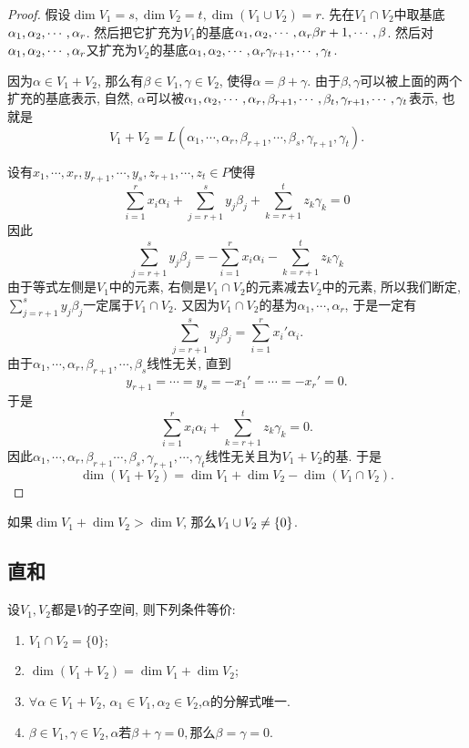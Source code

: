 \documentclass{ctexart}
\begin{document}
\begin{proof}
    假设$\dim V_1=s,\dim V_2=t, \dim (V_1\cup V_2)=r$. 先在$V_1 \cap V_2$中取基底${{\alpha}_1, {\alpha}_2,\cdots, {\alpha}_{r}}$. 然后把它扩充为$V_1$的基底${{\alpha}_1, {\alpha}_2,\cdots, {\alpha}_{r}} \beta{r+1},\cdots, \beta$. 然后对${{\alpha}_1, {\alpha}_2,\cdots, {\alpha}_{r}}$又扩充为$V_2$的基底${{\alpha}_1, {\alpha}_2,\cdots, {\alpha}_{r}} \gamma_{r+1},\cdots, \gamma_t$. 

    因为$\alpha\in V_1+V_2$, 那么有$\beta\in V_1,\gamma\in V_2$, 使得$\alpha=\beta+\gamma$. 由于$\beta,\gamma$可以被上面的两个扩充的基底表示, 自然, $\alpha$可以被${{\alpha}_1, {\alpha}_2,\cdots, {\alpha}_{r}}, \beta_{r+1},\cdots, \beta_{t},\gamma_{r+1},\cdots, \gamma_t$表示, 也就是
    \[
        V_1+V_2=L(\alpha_1,\cdots, \alpha_r, \beta_{r+1},\cdots, \beta_s,\gamma_{r+1},\gamma_t).
    \]

    设有$x_1, \cdots, x_r, y_{r+1}, \cdots, y_s, z_{r+1},\cdots,z_t\in P$使得
    \[
        \sum_{i=1}^{r}x_i\alpha_i + \sum_{j=r+1}^{s} y_j\beta_j + \sum_{k=r+1}^{t}z_k\gamma_k=0
    \]
    因此
    \[
       \sum_{j=r+1}^{s} y_j\beta_j =- \sum_{i=1}^{r}x_i\alpha_i-  \sum_{k=r+1}^{t}z_k\gamma_k
    \]
    由于等式左侧是$V_1$中的元素, 右侧是$V_1\cap V_2$的元素减去$V_2$中的元素, 所以我们断定,  $\sum_{j=r+1}^{s} y_j\beta_j$一定属于$V_1\cap V_2$. 又因为$V_1\cap V_2$的基为$\alpha_1,\cdots, \alpha_r$, 于是一定有
    \[
        \sum_{j=r+1}^{s}y_j\beta_j=\sum_{i=1}^{r}x_i'\alpha_i.
    \]
    由于$\alpha_1,\cdots, \alpha_r,\beta_{r+1},\cdots, \beta_s$线性无关, 直到
    \[
        y_{r+1}=\cdots=y_s=-x_1'=\cdots=-x_r'=0.
    \]
    于是
    \[
        \sum_{i=1}^{r}x_i\alpha_i+\sum_{k=r+1}^{t}z_k\gamma_k=0.
    \]
    因此$\alpha_1,\cdots,\alpha_r,\beta_{r+1}\cdots,\beta_s,\gamma_{r+1},\cdots,\gamma_t$线性无关且为$V_1+V_2$的基. 于是
    \[
        \dim (V_1+V_2)=\dim V_1+\dim V_2-\dim(V_1\cap V_2).
    \]
\end{proof}

\begin{corollary}
    如果$\dim V_1+\dim V_2>\dim V$, 那么$V_1\cup V_2 \neq \{0\}$.
\end{corollary}

\subsection{直和} 

\begin{theorem}[直和的等价定义]
    设$V_{1},V_{2}$都是$V$的子空间, 则下列条件等价:
    \begin{enumerate}
        \item $V_{1}\cap V_{2}=\{0\}$;
        \item $\dim(V_{1}+V_{2})=\dim V_{1}+\dim V_{2}$;
        \item $\forall\alpha\in V_{1}+V_{2}$, $\alpha_{1}\in V_{1},\alpha_{2}\in V_{2}$,$\alpha$的分解式唯一. 
        \item $\beta\in V_1,\gamma\in V_2,\alpha$若$\beta+\gamma=0,$那么$\beta=\gamma=0$.
    \end{enumerate}
\end{theorem}
\end{document}
